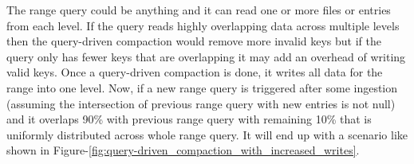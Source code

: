 The range query could be anything and it can read one or more files or entries from each level. If the query reads highly
overlapping data across multiple levels then the query-driven compaction would remove more invalid keys but if the query only 
has fewer keys that are overlapping it may add an overhead of writing valid keys. 
Once a query-driven compaction is done, it writes all data for the range into one level. Now, if a new range query is 
triggered after some ingestion (assuming the intersection of previous range query with new entries is not 
null) and it overlaps 90\% with previous range query with remaining 10\% that is uniformly 
distributed across whole range query. It will end up with a scenario like shown in Figure-\ref{fig:query-driven_compaction_with_increased_writes}.


